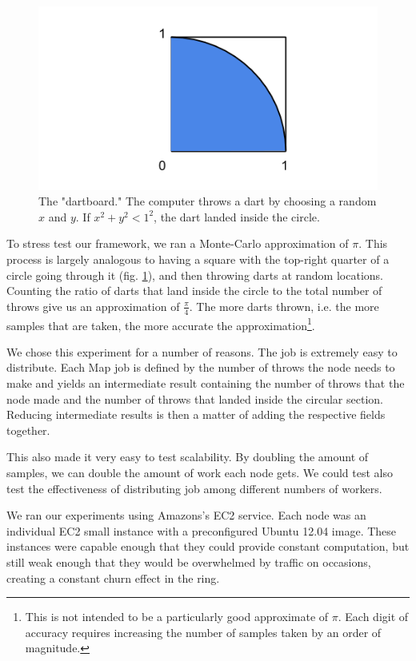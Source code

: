 \documentclass[10pt, conference, compsocconf]{IEEEtran}
\begin{document}
\begin{figure}
    \includegraphics[width=\linewidth]{dartboard}
    \caption{The "dartboard." The computer throws a dart by choosing a random $x$ and $y$.  If $x^{2} + y^{2} < 1^{2} $, the dart landed inside the circle.}
    \label{dartboard}
\end{figure}


To stress test our framework, we ran a Monte-Carlo approximation of $\pi$. This process is largely analogous to having a square with the top-right quarter of a circle going through it (fig. \ref{dartboard}), and then throwing darts at random locations. Counting the ratio of darts that land inside the circle to the total number of throws give us an approximation of $\frac{\pi}{4}$.  The more darts thrown, i.e. the more samples that are taken, the more accurate the approximation\footnote{This is not intended to be a particularly good approximate of $\pi$. Each digit of accuracy requires increasing the number of samples taken by an order of magnitude.}.

We chose this experiment for a number of reasons. The job is extremely easy to distribute. Each Map job is defined by the number of throws the node needs to make and yields an intermediate result containing the number of throws that the node made and the number of throws that landed inside the circular section.  Reducing intermediate results is then a matter of adding the respective fields together. 

This also made it very easy to test scalability. By doubling the amount of samples, we can double the amount of work each node gets.  We could test also test the effectiveness of distributing job among different numbers of workers. 

We ran our experiments using Amazons's EC2 service.  Each node was an individual EC2 small instance \cite{amazon-instances} with a preconfigured Ubuntu 12.04 image.  These instances were capable enough that they could provide constant computation, but still weak enough that they would be overwhelmed by traffic on occasions, creating a constant churn effect in the ring.  
\end{document}
